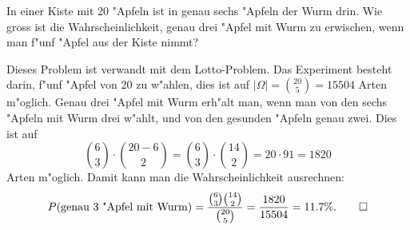 In einer Kiste mit 20 "Apfeln ist in genau sechs "Apfeln der Wurm drin.
Wie gross ist die Wahrscheinlichkeit, genau drei "Apfel mit Wurm zu
erwischen, wenn man f"unf "Apfel aus der Kiste nimmt?

\begin{loesung}
Dieses Problem ist verwandt mit dem Lotto-Problem.
Das Experiment besteht darin, f"unf "Apfel von 20 zu w"ahlen, dies ist auf
$|\Omega|=\binom{20}{5}=15504$ Arten m"oglich.
Genau drei "Apfel mit Wurm erh"alt man, wenn man von den sechs "Apfeln mit
Wurm drei w"ahlt, und von den gesunden "Apfeln genau zwei. Dies ist auf
\[
\binom{6}{3}\cdot\binom{20-6}{2}
=
\binom{6}{3}\cdot\binom{14}{2}
=
20\cdot 91=1820
\]
Arten m"oglich. Damit kann man die Wahrscheinlichkeit ausrechnen:
\[
P(\text{genau 3 "Apfel mit Wurm})=\frac{\binom{6}{3}\binom{14}{2}}{\binom{20}{5}}
=\frac{1820}{15504}=11.7\%.
\qedhere
\]
\end{loesung}

